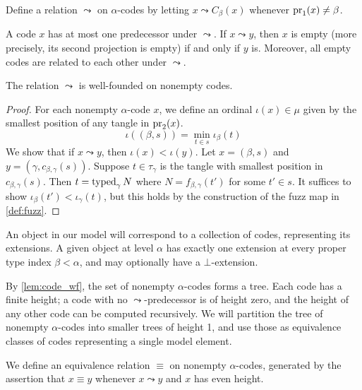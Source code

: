 \begin{definition}
    Define a relation \( \rightcurvedarrow \) on \( \alpha \)-codes by letting \( x \rightcurvedarrow C_\beta(x) \) whenever \( \operatorname{pr}_1(x) \neq \beta \).
\end{definition}
\begin{remark}
    A code \( x \) has at most one predecessor under \( \rightcurvedarrow \).
    If \( x \rightcurvedarrow y \), then \( x \) is empty (more precisely, its second projection is empty) if and only if \( y \) is.
    Moreover, all empty codes are related to each other under \( \rightcurvedarrow \).
\end{remark}

\begin{lemma}
    \label{lem:code_wf}
    The relation \( \rightcurvedarrow \) is well-founded on nonempty codes.
\end{lemma}
\begin{proof}
    For each nonempty \( \alpha \)-code \( x \), we define an ordinal \( \iota(x) \in \mu \) given by the smallest position of any tangle in \( \operatorname{pr}_2(x) \).
    \[ \iota((\beta, s)) = \min_{t \in s} \iota_\beta(t) \]
    We show that if \( x \rightcurvedarrow y \), then \( \iota(x) < \iota(y) \).
    Let \( x = (\beta, s) \) and \( y = (\gamma, c_{\beta,\gamma}(s)) \).
    Suppose \( t \in \tau_\gamma \) is the tangle with smallest position in \( c_{\beta,\gamma}(s) \).
    Then \( t = \operatorname{typed}_\gamma N \) where \( N = f_{\beta,\gamma}(t') \) for some \( t' \in s \).
    It suffices to show \( \iota_\beta(t') < \iota_\gamma(t) \), but this holds by the construction of the fuzz map in \cref{def:fuzz}.
\end{proof}

An object in our model will correspond to a collection of codes, representing its extensions.
A given object at level \( \alpha \) has exactly one extension at every proper type index \( \beta < \alpha \), and may optionally have a \( \bot \)-extension.

By \cref{lem:code_wf}, the set of nonempty \( \alpha \)-codes forms a tree.
Each code has a finite height; a code with no \( \rightcurvedarrow \)-predecessor is of height zero, and the height of any other code can be computed recursively.
We will partition the tree of nonempty \( \alpha \)-codes into smaller trees of height 1, and use those as equivalence classes of codes representing a single model element.

\begin{definition}
    We define an equivalence relation \( \equiv \) on nonempty \( \alpha \)-codes, generated by the assertion that \( x \equiv y \) whenever \( x \rightcurvedarrow y \) and \( x \) has even height.
\end{definition}

